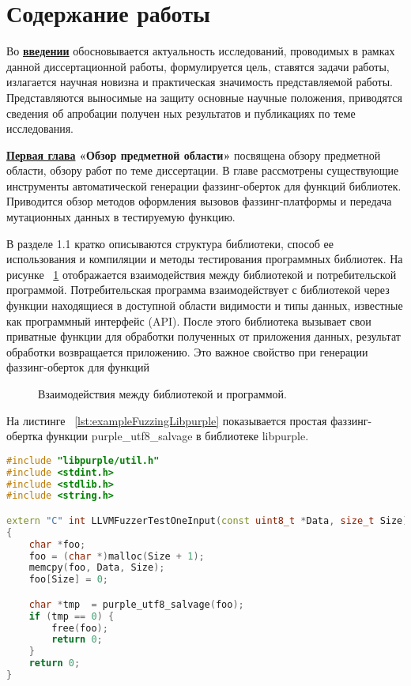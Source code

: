 
\section*{Содержание работы}
Во \underline{\textbf{введении}} обосновывается актуальность исследований, проводимых  в рамках данной диссертационной работы, формулируется цель, ставятся задачи работы, излагается научная новизна и практическая значимость представляемой работы. Представляются выносимые на защиту основные научные положения, приводятся сведения об апробации получен­ ных результатов и публикациях по теме исследования.

\underline{\textbf{Первая глава}} {\textbf{«Обзор предметной области»}} посвящена обзору предметной области, обзору работ по теме диссертации. В главе рассмотрены существующие инструменты автоматической генерации фаззинг-оберток для функций библиотек. Приводится обзор методов оформления вызовов фаззинг-платформы и передача мутационных данных в тестируемую функцию.

В разделе 1.1 кратко описываются структура библиотеки, способ ее использования и компиляции и методы тестирования программных библиотек. На рисунке ~\cref{fig:LibraryInterface} отображается взаимодействия между библиотекой и потребительской программой.  Потребительская программа взаимодействует с библиотекой через функции находящиеся в доступной области видимости и типы данных, известные как программный интерфейс (API). После этого библиотека вызывает свои приватные функции для обработки полученных от приложения данных, результат обработки возвращается приложению. Это важное свойство при генерации фаззинг-оберток для функций 

\begin{figure}[ht]
    \caption{Взаимодействия между библиотекой и программой.}\label{fig:LibraryInterface}
\end{figure}

На листинге ~\cref{lst:exampleFuzzingLibpurple} показывается простая фаззинг-обертка функции purple\_utf8\_salvage в библиотеке libpurple. 

\begin{lstlisting}[language=C++,frame=single,caption={Простой пример фаззинг-обертки},label=lst:exampleFuzzingLibpurple]
#include "libpurple/util.h"
#include <stdint.h>
#include <stdlib.h>
#include <string.h>

extern "C" int LLVMFuzzerTestOneInput(const uint8_t *Data, size_t Size) 
{
    char *foo;
    foo = (char *)malloc(Size + 1);
    memcpy(foo, Data, Size);
    foo[Size] = 0;

    char *tmp  = purple_utf8_salvage(foo);
    if (tmp == 0) {
        free(foo);
        return 0;
    }
    return 0;
}\end{lstlisting} 


